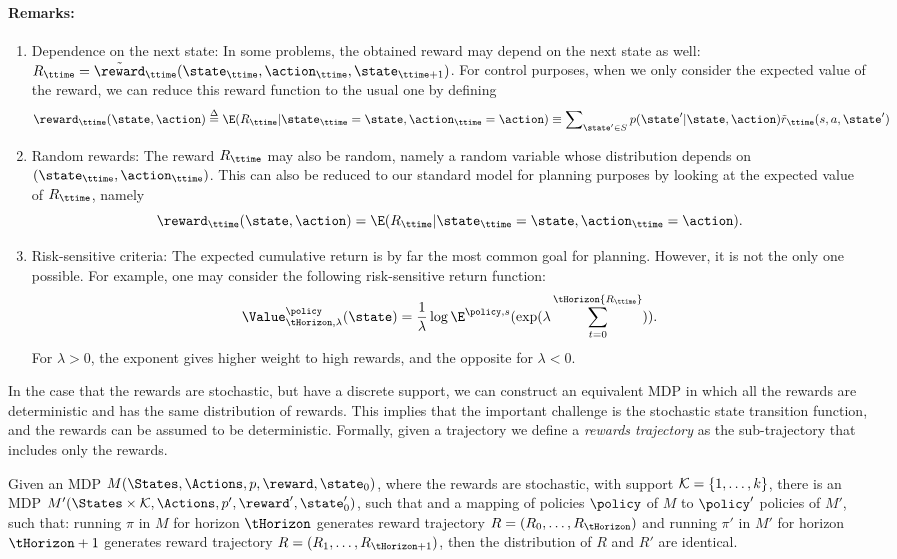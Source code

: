 \paragraph{Remarks:}
\begin{enumerate}
  \item Dependence on the next state:  In some problems, the obtained reward may depend on the next state as well: ${R_\ttime} = {\tilde \reward_\ttime}({\state_\ttime},{\action_\ttime},{\state_{\ttime + 1}})$.  For control purposes, when we only consider the expected value of the reward, we can reduce this reward function to the usual one by defining
\[{\reward_\ttime}(\state,\action) \buildrel \Delta \over = \E({R_\ttime}|{\state_\ttime} = \state,{\action_\ttime} = \action) \equiv \sum\nolimits_{\state' \in S} {p(\state'|\state,\action){{\tilde r}_\ttime}(} s,a,\state')\]
  \item Random rewards:  The reward ${R_\ttime}$ may also be random, namely a random variable whose distribution depends on $({\state_\ttime},{\action_\ttime})$.  This can also be reduced to our standard model for planning purposes by looking at the expected value of ${R_\ttime}$, namely \[{\reward_\ttime}(\state,\action) = \E({R_\ttime}|{\state_\ttime} = \state,{\action_\ttime} =
  \action).\]
  \item Risk-sensitive criteria: The expected cumulative return is by far the most common goal for planning. However, it is not the only one possible. For example, one may consider the following risk-sensitive  return function:
\[\Value_{{\tHorizon,\lambda }}^\policy (\state) = \frac{1}{\lambda }\log {\E^{\policy ,s}}(\exp (\lambda \sum\limits_{t = 0}^\tHorizon {{R_\ttime}} )).\]
For $\lambda  > 0$, the exponent gives higher weight to high rewards, and the opposite for $\lambda  < 0$.
\end{enumerate}

In the case that the rewards are stochastic, but have a discrete
support, we can construct an equivalent MDP in which all the rewards
are deterministic and has the same distribution of rewards. This
implies that the important challenge is the stochastic state
transition function, and the rewards can be assumed to be
deterministic.
%
Formally, given a trajectory we define a {\em rewards trajectory} as
the sub-trajectory that includes only the rewards.



\begin{theorem}
\label{thm:K-rewards}
%
 Given an MDP $M(\States,\Actions,p,\reward,\state_0)$,
where the rewards are stochastic, with support ${\cal
K}=\{1,\ldots,k\}$, there is an MDP $M'(\States\times {\cal
K},\Actions,p',\reward',\state_0')$, such that and a mapping of
policies $\policy$ of $M$ to $\policy'$ policies of $M'$, such that:
running $\pi$ in $M$ for horizon $\tHorizon$ generates reward
trajectory $R=(R_0, \ldots , R_{\tHorizon})$ and running $\pi'$ in
$M'$ for horizon $\tHorizon+1$ generates reward trajectory $R=(R_1,
\ldots , R_{\tHorizon+1})$, then the distribution of $R$ and $R'$
are identical.
\end{theorem}

